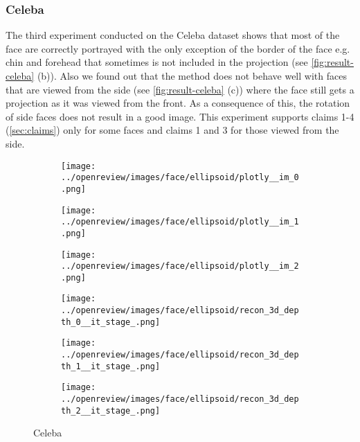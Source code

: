 \subsubsection{Celeba}
The third experiment conducted on the Celeba dataset shows that most of the face are correctly portrayed with the only exception of the border of the face e.g. chin and forehead that sometimes is not included in the projection (see \autoref{fig:result-celeba} (b)). Also we found out that the method does not behave well with faces that are viewed from the side (see \autoref{fig:result-celeba} (c)) where the face still gets a projection as it was viewed from the front. As a consequence of this, the rotation of side faces does not result in a good image. This experiment supports claims 1-4 (\autoref{sec:claims}) only for some faces and claims 1 and 3 for those viewed from the side.
\begin{figure}[h]
    \begin{subfigure}{0.33\textwidth}
        \centering
        \texttt{[image: ../openreview/images/face/ellipsoid/plotly\_\_im\_0.png]}
    \end{subfigure}
    \begin{subfigure}{0.33\textwidth}
        \centering
        \texttt{[image: ../openreview/images/face/ellipsoid/plotly\_\_im\_1.png]}
    \end{subfigure}
    \begin{subfigure}{0.33\textwidth}
        \centering
        \texttt{[image: ../openreview/images/face/ellipsoid/plotly\_\_im\_2.png]}
    \end{subfigure}
    \begin{subfigure}{0.33\textwidth}
        \centering
        \texttt{[image: ../openreview/images/face/ellipsoid/recon\_3d\_depth\_0\_\_it\_stage\_.png]}
        \caption{}
    \end{subfigure}
    \begin{subfigure}{0.33\textwidth}
        \centering
        \texttt{[image: ../openreview/images/face/ellipsoid/recon\_3d\_depth\_1\_\_it\_stage\_.png]}
        \caption{}
    \end{subfigure}
    \begin{subfigure}{0.33\textwidth}
        \centering
        \texttt{[image: ../openreview/images/face/ellipsoid/recon\_3d\_depth\_2\_\_it\_stage\_.png]}
        \caption{}
    \end{subfigure}
    \caption{Celeba}
    \label{fig:result-celeba}
\end{figure}

